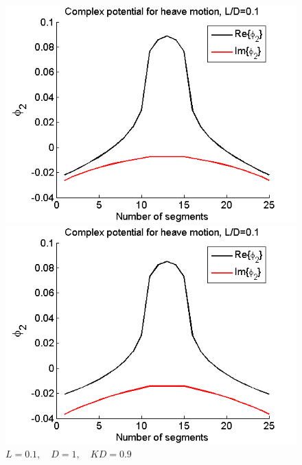 \documentclass[a4paper,10pt]{article}
\begin{document}
\begin{figure}[H]
  \includegraphics[width=\linewidth]{phi2_box3_12.png}
  \caption{$L = 0.1 , \quad D = 1 , \quad K D = 1.2$}\label{box3_1.2}
\endminipage\hfill
{}
  \includegraphics[width=\linewidth]{phi2_box3_09.png}
  \caption{$L = 0.1 , \quad D = 1 , \quad K D = 0.9$}\label{box3_0.9}
\endminipage
\end{figure}
\end{document}
